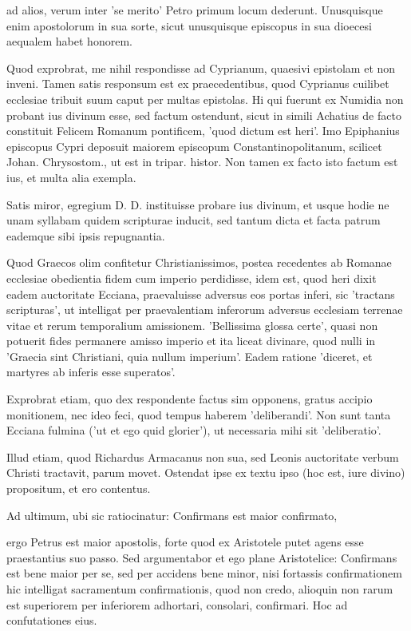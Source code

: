 ad alios, verum inter 'se merito' Petro primum locum dederunt. Unusquisque enim apostolorum in sua sorte, sicut unusquisque episcopus in sua dioecesi aequalem habet honorem.

Quod exprobrat, me nihil respondisse ad Cyprianum, quaesivi epistolam et non inveni. Tamen satis responsum est ex praecedentibus, quod Cyprianus cuilibet ecclesiae tribuit suum caput per multas epistolas. Hi qui fuerunt ex Numidia non probant ius divinum esse, sed factum ostendunt, sicut in simili Achatius de facto constituit Felicem Romanum pontificem, 'quod dictum est heri'. Imo Epiphanius episcopus Cypri deposuit maiorem episcopum Constantinopolitanum, scilicet Johan. Chrysostom., ut est in tripar. histor. Non tamen ex facto isto factum est ius, et multa alia exempla.

\marginpar{\small[277]} Satis miror, egregium D. D. instituisse probare ius divinum, et usque hodie ne unam syllabam quidem scripturae inducit, sed tantum dicta et facta patrum eademque sibi ipsis repugnantia.

Quod Graecos olim confitetur Christianissimos, postea recedentes ab Romanae ecclesiae obedientia fidem cum imperio perdidisse, idem est, quod heri dixit eadem auctoritate Ecciana, praevaluisse adversus eos portas inferi, sic 'tractans scripturas', ut intelligat per praevalentiam inferorum adversus ecclesiam terrenae vitae et rerum temporalium amissionem. 'Bellissima glossa certe', quasi non potuerit fides permanere amisso imperio et ita liceat divinare, quod nulli in 'Graecia sint Christiani, quia nullum imperium'. Eadem ratione 'diceret, et martyres ab inferis esse superatos'.

Exprobrat etiam, quo dex respondente factus sim opponens, gratus accipio monitionem, nec ideo feci, quod tempus haberem 'deliberandi'. Non sunt tanta Ecciana fulmina ('ut et ego quid glorier'), ut necessaria mihi sit 'deliberatio'.

Illud etiam, quod Richardus Armacanus non sua, sed Leonis auctoritate verbum Christi tractavit, parum movet. Ostendat ipse ex textu ipso (hoc est, iure divino) propositum, et ero contentus.

Ad ultimum, ubi sic ratiocinatur: Confirmans est maior confirmato,

ergo Petrus est maior apostolis, forte quod ex Aristotele putet agens esse praestantius suo passo. Sed argumentabor et ego plane Aristotelice: Confirmans est bene maior per se, sed per accidens bene minor, nisi fortassis confirmationem hic intelligat sacramentum confirmationis, quod non credo, alioquin non rarum est superiorem per inferiorem adhortari, consolari, confirmari. Hoc ad confutationes eius.


